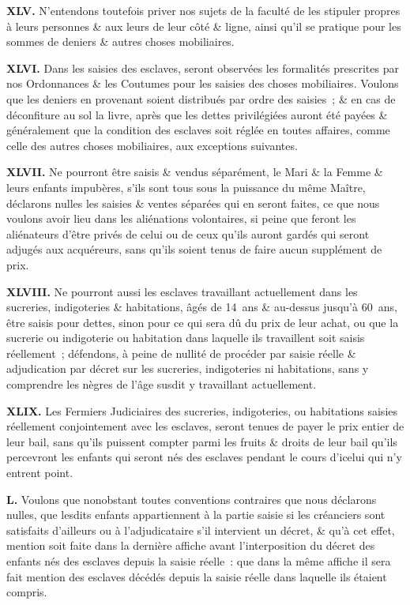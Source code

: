 \documentclass[french,twoside]{book} %
\newcommand{\labelchar}[1]{\textbf{\color{rubric} #1}}
\begin{document}
\labelchar{XLV.} N’entendons toutefois priver nos sujets de la faculté de les stipuler propres à leurs personnes \& aux leurs de leur côté \& ligne, ainsi qu’il se pratique pour les sommes de deniers \& autres choses mobiliaires.\par
\labelchar{XLVI.} Dans les saisies des esclaves, seront observées les formalités prescrites par nos Ordonnances \& les Coutumes pour les saisies des choses mobiliaires. Voulons que les deniers en provenant soient distribués par ordre des saisies ; \& en cas de déconfiture au sol la livre, après que les dettes privilégiées auront été payées \& généralement que la condition des esclaves soit réglée en toutes affaires, comme celle des autres choses mobiliaires, aux exceptions suivantes.\par
\labelchar{XLVII.} Ne pourront être saisis \& vendus séparément, le Mari \& la Femme \& leurs enfants impubères, s’ils sont tous sous la puissance du même Maître, déclarons nulles les saisies \& ventes séparées qui en seront faites, ce que nous voulons avoir lieu dans les aliénations volontaires, si peine que feront les aliénateurs d’être privés de celui ou de ceux qu’ils auront gardés qui seront adjugés aux acquéreurs, sans qu’ils soient tenus de faire aucun supplément de prix.\par
\labelchar{XLVIII.} Ne pourront aussi les esclaves travaillant actuellement dans les sucreries, indigoteries \& habitations, âgés de 14 ans \& au-dessus jusqu’à 60 ans, être saisis pour dettes, sinon pour ce qui sera dû du prix de leur achat, ou que la sucrerie ou indigoterie ou habitation dans laquelle ils travaillent soit saisis réellement ; défendons, à peine de nullité de procéder par saisie réelle \& adjudication par décret sur les sucreries, indigoteries ni habitations, sans y comprendre les nègres de l’âge susdit y travaillant actuellement.\par
\labelchar{XLIX.} Les Fermiers Judiciaires des sucreries, indigoteries, ou habitations saisies réellement conjointement avec les esclaves, seront tenues de payer le prix entier de leur bail, sans qu’ils puissent compter parmi les fruits \& droits de leur bail qu’ils percevront les enfants qui seront nés des esclaves pendant le cours d’icelui qui n’y entrent point.\par
\labelchar{L.} Voulons que nonobstant toutes conventions contraires que nous déclarons nulles, que lesdits enfants appartiennent à la partie saisie si les créanciers sont satisfaits d’ailleurs ou à l’adjudicataire s’il intervient un décret, \& qu’à cet effet, mention soit faite dans la dernière affiche avant l’interposition du décret des enfants nés des esclaves depuis la saisie réelle : que dans la même affiche il sera fait mention des esclaves décédés depuis la saisie réelle dans laquelle ils étaient compris.\par
\end{document}
